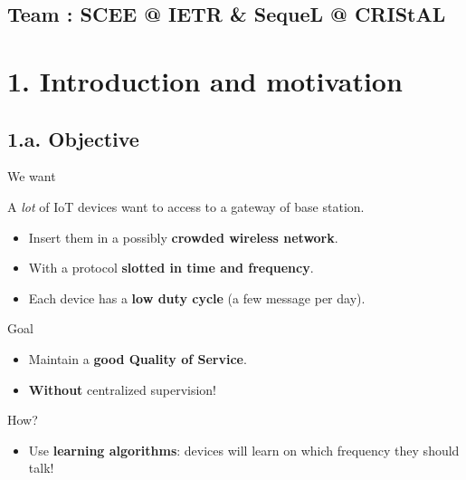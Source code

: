 \documentclass[12pt,english,ignorenonframetext,]{beamer}
\providecommand{\tightlist}{%
  \setlength{\itemsep}{0pt}\setlength{\parskip}{0pt}}
\begin{document}
\subsection*{\hfill{}Team {:} SCEE @ IETR \& SequeL @ CRIStAL\hfill{}}




\section{\hfill{}1. Introduction and motivation\hfill{}}

\subsection{\hfill{}1.a. Objective\hfill{}}

\begin{frame}{We want}

  A \emph{lot} of IoT devices want to access to a gateway of base station.

\begin{itemize}
\tightlist
\item
  Insert them in a possibly \textbf{crowded wireless network}.
\item
  With a protocol \textbf{slotted in time and frequency}.
\item
  Each device has a \textbf{low duty cycle} (a few message per day).
\end{itemize}

\pause

\begin{block}{Goal}

\begin{itemize}
\tightlist
\item
  Maintain a \textbf{good Quality of Service}.
\item
  \textbf{Without} centralized supervision!
\end{itemize}

\end{block}

\pause

\begin{block}{How?}

\begin{itemize}
\tightlist
\item
  Use \textbf{learning algorithms}: devices will learn on which
  frequency they should talk!
\end{itemize}

\end{block}

\end{frame}
\end{document}
